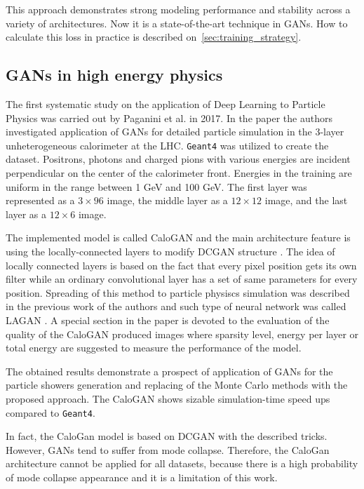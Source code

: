 \documentclass{webofc}
\begin{document}
This approach demonstrates strong modeling performance and stability across a variety of architectures.  Now it is a state-of-the-art technique in GANs. 
How to calculate this loss in practice is described on~\cref{sec:training_strategy}.

\subsection{GANs in high energy physics}
The first systematic study on the application of Deep Learning to Particle Physics was carried out by Paganini et al. in 2017. In the paper \cite{paganini2017calogan} the authors investigated application of GANs for detailed particle simulation in the 3-layer unheterogeneous calorimeter at the LHC. \texttt{Geant4} was utilized to create the dataset. Positrons, photons and charged pions with various energies are incident perpendicular on the center of the calorimeter front. Energies in the training are uniform in the range between 1 GeV and 100 GeV.  The first layer was represented as a $3 \times 96$ image, the middle layer as a $12 \times 12$ image, and the last layer as a $12 \times 6$ image. 

The implemented model is called CaloGAN and the main architecture feature is using the locally-connected layers \cite{taigman2014deepface} to modify DCGAN structure \cite{radford2015unsupervised}. The idea of locally connected layers is based on the fact that every pixel position gets its own filter while an ordinary convolutional layer has a set of  same parameters for every position. Spreading of this method to particle physiscs simulation was described in the previous work of the authors and such type of neural network was called LAGAN \cite{de2017learning}. A special section in the paper is devoted to the evaluation of the quality of the CaloGAN produced images where  sparsity level,  energy per layer or total energy are suggested to measure the performance of the model. 

The obtained results demonstrate a prospect of application of GANs for the particle showers generation and replacing of the Monte Carlo methods with the proposed approach. The CaloGAN shows sizable simulation-time speed ups compared to \texttt{Geant4}. 

In fact, the CaloGan model is based on DCGAN with the described tricks. However, GANs tend to suffer from mode collapse. Therefore, the CaloGan architecture cannot be applied for all datasets, because there is a high probability of mode collapse appearance and it is a limitation of this work.
\end{document}
